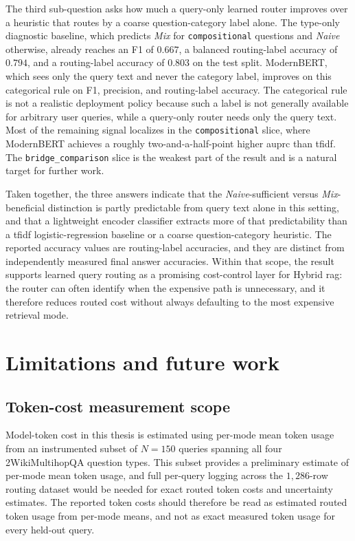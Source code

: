 \documentclass[english, bibtex]{kththesis}               %
\numberwithin{listing}{chapter}
\begin{document}
The third sub-question asks how much a query-only learned router improves over a heuristic that routes by a coarse question-category label alone. The type-only diagnostic baseline, which predicts \emph{Mix} for \texttt{compositional} questions and \emph{Naive} otherwise, already reaches an F1 of $0.667$, a balanced routing-label accuracy of $0.794$, and a routing-label accuracy of $0.803$ on the test split. ModernBERT, which sees only the query text and never the category label, improves on this categorical rule on F1, precision, and routing-label accuracy. The categorical rule is not a realistic deployment policy because such a label is not generally available for arbitrary user queries, while a query-only router needs only the query text. Most of the remaining signal localizes in the \texttt{compositional} slice, where ModernBERT achieves a roughly two-and-a-half-point higher \gls{auprc} than \gls{tfidf}. The \texttt{bridge\_comparison} slice is the weakest part of the result and is a natural target for further work.

Taken together, the three answers indicate that the \emph{Naive}-sufficient versus \emph{Mix}-beneficial distinction is partly predictable from query text alone in this setting, and that a lightweight encoder classifier extracts more of that predictability than a \gls{tfidf} logistic-regression baseline or a coarse question-category heuristic. The reported accuracy values are routing-label accuracies, and they are distinct from independently measured final answer accuracies. Within that scope, the result supports learned query routing as a promising cost-control layer for Hybrid \gls{rag}: the router can often identify when the expensive path is unnecessary, and it therefore reduces routed cost without always defaulting to the most expensive retrieval mode.

\section{Limitations and future work}
\label{sec:limitationsFutureWork}

\subsection{Token-cost measurement scope}
\label{sec:limitTokenCost}

Model-token cost in this thesis is estimated using per-mode mean token usage from an instrumented subset of \(N = 150\) queries spanning all four 2WikiMultihopQA question types. This subset provides a preliminary estimate of per-mode mean token usage, and full per-query logging across the $1{,}286$-row routing dataset would be needed for exact routed token costs and uncertainty estimates. The reported token costs should therefore be read as estimated routed token usage from per-mode means, and not as exact measured token usage for every held-out query.
\end{document}
